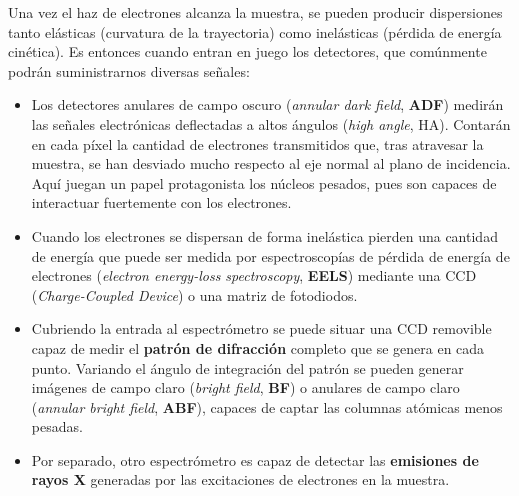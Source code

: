 Una vez el haz de electrones alcanza la muestra, se pueden producir dispersiones tanto elásticas (curvatura de la trayectoria) como inelásticas (pérdida de energía cinética). Es entonces cuando entran en juego los detectores, que comúnmente podrán suministrarnos diversas señales:

\begin{itemize}
    \item Los detectores anulares de campo oscuro (\textit{annular dark field}, \textbf{ADF}) medirán las señales electrónicas deflectadas a altos ángulos (\textit{high angle}, HA). Contarán en cada píxel la cantidad de electrones transmitidos que, tras atravesar la muestra, se han desviado mucho respecto al eje normal al plano de incidencia. Aquí juegan un papel protagonista los núcleos pesados, pues son capaces de interactuar fuertemente con los electrones.
    
    \item Cuando los electrones se dispersan de forma inelástica pierden una cantidad de energía que puede ser medida por espectroscopías de pérdida de energía de electrones (\textit{electron energy-loss spectroscopy}, \textbf{EELS}) mediante una CCD (\textit{Charge-Coupled Device}) o una matriz de fotodiodos.
    
    \item Cubriendo la entrada al espectrómetro se puede situar una CCD removible capaz de medir el \textbf{patrón de difracción} completo que se genera en cada punto. Variando el ángulo de integración del patrón se pueden generar imágenes de campo claro (\textit{bright field}, \textbf{BF}) o anulares de campo claro (\textit{annular bright field}, \textbf{ABF}), capaces de captar las columnas atómicas menos pesadas.
    
    \item Por separado, otro espectrómetro es capaz de detectar las \textbf{emisiones de rayos X} generadas por las excitaciones de electrones en la muestra.
\end{itemize}

\vspace{0.1cm}

